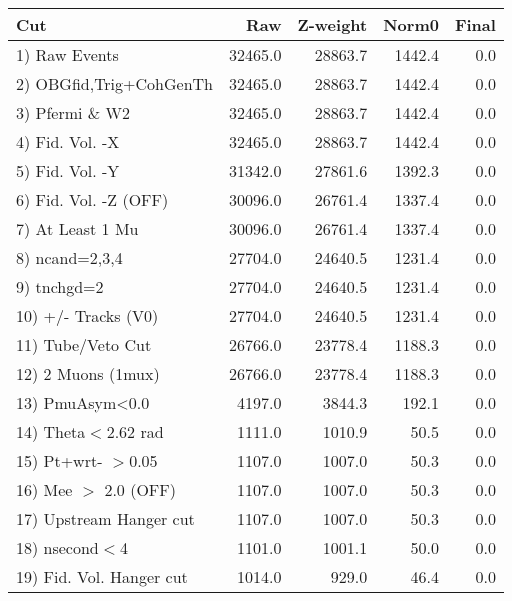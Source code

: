  \begin{table}[h!]\centering
 \begin{tabular}{||l||r|r|r|r||}
 \hline
 \hline
 Cut & Raw & Z-weight & Norm0 & Final \\
 \hline
  1) Raw Events           &     32465.0 &     28863.7 &      1442.4 &         0.0 \\
  2) OBGfid,Trig+CohGenTh &     32465.0 &     28863.7 &      1442.4 &         0.0 \\
  3) Pfermi \& W2         &     32465.0 &     28863.7 &      1442.4 &         0.0 \\
  4) Fid. Vol. -X         &     32465.0 &     28863.7 &      1442.4 &         0.0 \\
  5) Fid. Vol. -Y         &     31342.0 &     27861.6 &      1392.3 &         0.0 \\
  6) Fid. Vol. -Z (OFF)   &     30096.0 &     26761.4 &      1337.4 &         0.0 \\
  7) At Least 1 Mu        &     30096.0 &     26761.4 &      1337.4 &         0.0 \\
  8) ncand=2,3,4          &     27704.0 &     24640.5 &      1231.4 &         0.0 \\
  9) tnchgd=2             &     27704.0 &     24640.5 &      1231.4 &         0.0 \\
 10) +/- Tracks (V0)      &     27704.0 &     24640.5 &      1231.4 &         0.0 \\
 11) Tube/Veto Cut        &     26766.0 &     23778.4 &      1188.3 &         0.0 \\
 12) 2 Muons (1mux)       &     26766.0 &     23778.4 &      1188.3 &         0.0 \\
 13) PmuAsym<0.0          &      4197.0 &      3844.3 &       192.1 &         0.0 \\
 14) Theta$<$2.62 rad     &      1111.0 &      1010.9 &        50.5 &         0.0 \\
 15) Pt+wrt- $>$0.05      &      1107.0 &      1007.0 &        50.3 &         0.0 \\
 16) Mee $>$ 2.0  (OFF)   &      1107.0 &      1007.0 &        50.3 &         0.0 \\
 17) Upstream Hanger cut  &      1107.0 &      1007.0 &        50.3 &         0.0 \\
 18) nsecond$<$4          &      1101.0 &      1001.1 &        50.0 &         0.0 \\
 19) Fid. Vol. Hanger cut &      1014.0 &       929.0 &        46.4 &         0.0 \\

\end{tabular}
\end{table}
